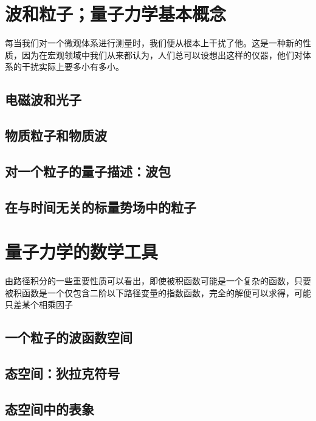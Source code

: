 








\maketitle
{}
\tableofcontents\newpage
{}

\setcounter{page}{1}
\section{波和粒子；量子力学基本概念}
每当我们对一个微观体系进行测量时，我们便从根本上干扰了他。这是一种新的性质，因为在宏观领域中我们从来都认为，人们总可以设想出这样的仪器，他们对体系的干扰实际上要多小有多小。\cite{Cohen}
\subsection{电磁波和光子}
\subsection{物质粒子和物质波}%
\subsection{对一个粒子的量子描述：波包}
\subsection{在与时间无关的标量势场中的粒子}
\section{量子力学的数学工具}
由路径积分的一些重要性质可以看出，即使被积函数可能是一个复杂的函数，只要被积函数是一个仅包含二阶以下路径变量的指数函数，完全的解便可以求得，可能只差某个相乘因子\cite{Fymman}
\subsection{一个粒子的波函数空间}
\subsection{态空间：狄拉克符号}
\subsection{态空间中的表象}
